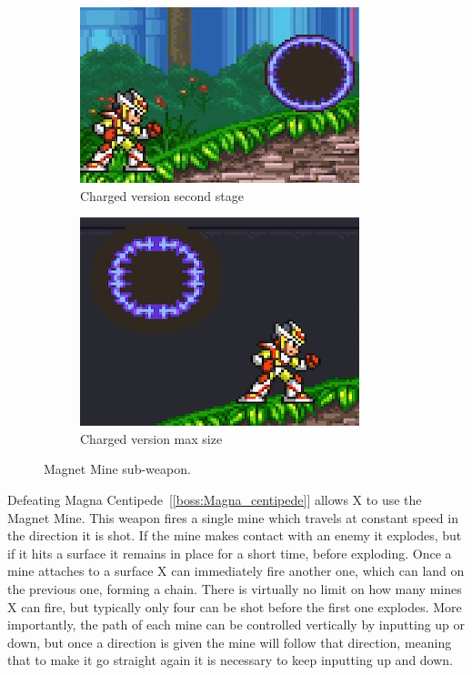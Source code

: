 \begin{figure}[htp]
	\ContinuedFloat
	\centering
	\begin{subfigure}[t]{0.4\linewidth}
		\centering
		\includegraphics[width=\linewidth]{figures/X2/weapons/M_mine_5.png}	
		\caption{Charged version second stage}
	\end{subfigure}
	\begin{subfigure}[t]{0.35\linewidth}
		\centering
		\includegraphics[width=\linewidth]{figures/X2/weapons/M_mine_6.png}	
		\caption{Charged version max size}
	\end{subfigure}
	\caption{Magnet Mine sub-weapon.}
\end{figure}
Defeating Magna Centipede~[\ref{boss:Magna_centipede}] allows X to use the Magnet Mine. This weapon fires a single mine which travels at constant speed in the direction it is shot. If the mine makes contact with an enemy it explodes, but if it hits a surface it remains in place for a short time, before exploding. Once a mine attaches to a surface X can immediately fire another one, which can land on the previous one, forming a chain. There is virtually no limit on how many mines X can fire, but typically only four can be shot before the first one explodes. More importantly, the path of each mine can be controlled vertically by inputting up or down, but once a direction is given the mine will follow that direction, meaning that to make it go straight again it is necessary to keep inputting up and down.

